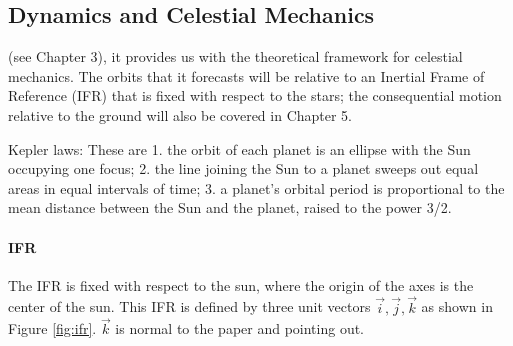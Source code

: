 \documentclass[11pt]{article}
\begin{document}
\subsection{Dynamics and Celestial Mechanics}
(see Chapter 3), it provides us with the theoretical framework for celestial
mechanics. The orbits that it forecasts will be relative to an Inertial Frame of Reference
(IFR) that is fixed with respect to the stars; the consequential motion relative to the ground
will also be covered in Chapter 5.

Kepler laws:
These are
1. the orbit of each planet is an ellipse with the Sun occupying one focus;
2. the line joining the Sun to a planet sweeps out equal areas in equal intervals of time;
3. a planet’s orbital period is proportional to the mean distance between the Sun and the
planet, raised to the power 3/2.\\

\paragraph{\ac{IFR}} 
The \ac{IFR} is fixed with respect to the sun, where the origin of the axes is the center of the sun. This \ac{IFR} is defined by three unit vectors $\vec{i}, \vec{j}, \vec{k}$ as shown in Figure \ref{fig:ifr}. $\vec{k}$ is normal to the paper and pointing out.
\end{document}
